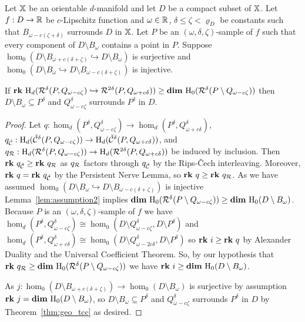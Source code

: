 
\begin{theorem}\label{thm:algo_tcc}
  Let $\mathbb{X}$ be an orientable $d$-manifold and let $D$ be a compact subset of $\mathbb{X}$.
  Let $f : D\to\mathbb{R}$ be $c$-Lipschitz function and $\omega\in\mathbb{R}$, $\delta\leq\zeta < \varrho_D$ be constants such that $B_{\omega - c(\zeta +\delta)}$ surrounds $D$ in $\mathbb{X}$.
  Let $P$ be an $(\omega, \delta,\zeta)$-sample of $f$ such that every component of $D\setminus B_\omega$ contains a point in $P$.
  Suppose $\hom_0(D\setminus B_{\omega+c(\delta+\zeta)}\hookrightarrow D\setminus B_\omega)$ is surjective and $\hom_0(D\setminus B_\omega\hookrightarrow D\setminus B_{\omega-c(\delta+\zeta)})$ is injective.

   If $\mathbf{rk}~\mathrm{H}_d(\mathcal{R}^\delta(P, Q_{\omega -c\zeta})\hookrightarrow \mathcal{R}^{2\delta}(P, Q_{\omega+c\delta})) \geq \mathbf{dim}~\mathrm{H}_0(\mathcal{R}^\delta(P\setminus Q_{\omega-c\zeta}))$ then $D\setminus B_\omega\subseteq P^\delta$ and $Q_{\omega-c\zeta}^\delta$ surrounds $P^\delta$ in $D$.
\end{theorem}
\begin{proof}
  Let $q : \hom_d(P^\delta, Q_{\omega-c\zeta}^\delta)\to \hom_d(P^\delta, Q_{\omega+c\delta}^\delta)$,
  $q_{\check{\mathcal{C}}} : \mathrm{H}_d(\check{\mathcal{C}}^{\delta}(P, Q_{\omega-c\zeta}))\to\mathrm{H}_d(\check{\mathcal{C}}^{\delta}(P, Q_{\omega+c\delta}))$, and
  $q_{\mathcal{R}} : \mathrm{H}_d(\mathcal{R}^{\delta}(P, Q_{\omega-c\zeta}))\to\mathrm{H}_d(\mathcal{R}^{2\delta}(P, Q_{\omega+c\delta}))$ be induced by inclusion.
  Then $\mathbf{rk}~q_{\check{\mathcal{C}}} \geq\mathbf{rk}~q_{\mathcal{R}}$ as $q_{\mathcal{R}}$ factors through $q_{\check{\mathcal{C}}}$ by the Rips-\v Cech interleaving.
  Moreover, $\mathbf{rk}~q = \mathbf{rk}~q_{\check{\mathcal{C}}}$ by the Persistent Nerve Lemma, so $\mathbf{rk}~q\geq \mathbf{rk}~q_{\mathcal{R}}$.
  As we have assumed $\hom_0(D\setminus B_\omega\hookrightarrow D\setminus B_{\omega-c(\delta+\zeta)})$ is injective Lemma~\ref{lem:assumption2} implies $\mathbf{dim}~\mathrm{H}_0(\mathcal{R}^\delta(P\setminus Q_{\omega-c\zeta}))\geq \mathbf{dim}~\mathrm{H}_0(D\setminus B_\omega)$.
  Because $P$ is an $(\omega, \delta, \zeta)$-sample of $f$ we have $\hom_d(P^\delta, Q_{\omega-c\zeta}^\delta)\cong \hom_0(D\setminus Q_{\omega-c\zeta}^\delta, D\setminus P^\delta)$ and $\hom_d(P^\delta, Q_{\omega+c\delta}^\delta)\cong \hom_0(D\setminus Q_{\omega-2c\delta}^\delta, D\setminus P^\delta)$ so $\mathbf{rk}~i\geq \mathbf{rk}~q$ by Alexander Duality and the Universal Coefficient Theorem.
  So, by our hypothesis that $\mathbf{rk}~q_{\mathcal{R}}\geq\mathbf{dim}~\mathrm{H}_0(\mathcal{R}^\delta(P\setminus Q_{\omega-c\zeta}))$ we have $\mathbf{rk}~i\geq\mathbf{dim}~\mathrm{H}_0(D\setminus B_\omega)$.

  As $j : \hom_0(D\setminus B_{\omega+c(\delta+\zeta)})\to \hom_0(D\setminus B_\omega)$ is surjective by assumption $\mathbf{rk}~j = \mathbf{dim}~\mathrm{H}_0(D\setminus B_\omega)$, so $D\setminus B_\omega\subseteq P^\delta$ and $Q_{\omega-c\zeta}^\delta$ surrounds $P^\delta$ in $D$ by Theorem~\ref{thm:geo_tcc} as desired.
\end{proof}
